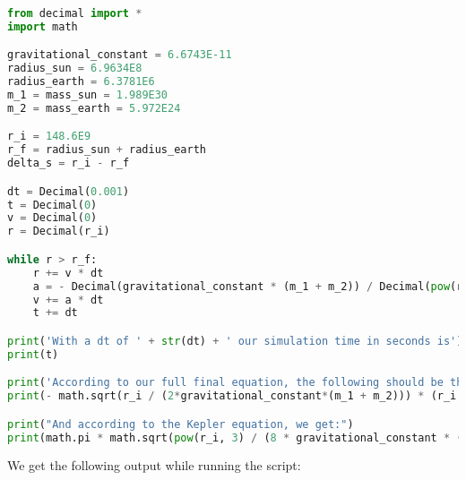 \documentclass{article}
\begin{document}
\begin{lstlisting}[language=Python]
from decimal import *
import math

gravitational_constant = 6.6743E-11
radius_sun = 6.9634E8
radius_earth = 6.3781E6
m_1 = mass_sun = 1.989E30
m_2 = mass_earth = 5.972E24

r_i = 148.6E9
r_f = radius_sun + radius_earth
delta_s = r_i - r_f

dt = Decimal(0.001)
t = Decimal(0)
v = Decimal(0)
r = Decimal(r_i)

while r > r_f:
    r += v * dt
    a = - Decimal(gravitational_constant * (m_1 + m_2)) / Decimal(pow(r, 2))
    v += a * dt
    t += dt

print('With a dt of ' + str(dt) + ' our simulation time in seconds is')
print(t)

print('According to our full final equation, the following should be the time in seconds:')
print(- math.sqrt(r_i / (2*gravitational_constant*(m_1 + m_2))) * (r_i * (math.atan(math.sqrt(r_f / delta_s)) - 0.5 * math.pi) - math.sqrt(r_f * delta_s)))

print("And according to the Kepler equation, we get:")
print(math.pi * math.sqrt(pow(r_i, 3) / (8 * gravitational_constant * (m_1 + m_2))))
\end{lstlisting}
We get the following output while running the script:
\end{document}
